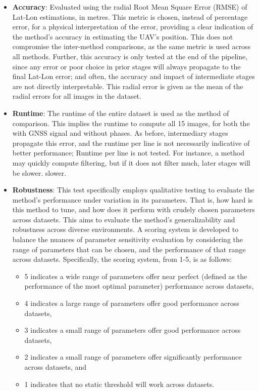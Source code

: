 \begin{itemize}
    \item \textbf{Accuracy}: Evaluated using the radial Root Mean Square Error (RMSE) of Lat-Lon estimations, in metres. This metric is chosen, instead of percentage error, for a physical interpretation of the error, providing a clear indication of the method's accuracy in estimating the UAV's position. This does not compromise the inter-method comparisons, as the same metric is used across all methods. Further, this accuracy is only tested at the end of the pipeline, since any error or poor choice in prior stages will always propagate to the final Lat-Lon error; and often, the accuracy and impact of intermediate stages are not directly interpretable. This radial error is given as the mean of the radial errors for all images in the dataset. 
    
    \item \textbf{Runtime}: The runtime of the entire dataset is used as the method of comparison. This implies the runtime to compute all 15 images, for both the with GNSS signal and without phases. As before, intermediary stages propagate this error, and the runtime per line is not necessarily indicative of better performance; Runtime per line is not tested. For instance, a method may quickly compute filtering, but if it does not filter much, later stages will be slower.
    slower.
    \item \textbf{Robustness}: This test specifically employs qualitative testing to evaluate the method's performance under variation in its parameters. That is, how hard is this method to tune, and how does it perform with crudely chosen parameters across datasets. This aims to evaluate the method's generalizability and robustness across diverse environments. A scoring system is developed to balance the nuances of parameter sensitivity evaluation by considering the range of parameters that can be chosen, and the performance of that range across datasets. Specifically, the scoring system, from 1-5, is as follows: 
        \begin{itemize}
            \item 5 indicates a wide range of parameters offer near perfect (defined as the performance of the most optimal parameter) performance across datasets,
            \item 4 indicates a large range of parameters offer good performance across datasets,
            \item 3 indicates a small range of parameters offer good performance across datasets,
            \item 2 indicates a small range of parameters offer significantly performance across datasets, and
            \item 1 indicates that no static threshold will work across datasets.
        \end{itemize}
    
\end{itemize}


